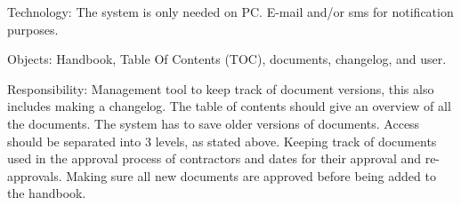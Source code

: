 Technology: The system is only needed on PC. E-mail and/or sms for notification purposes.

Objects: Handbook, Table Of Contents (TOC), documents, changelog, and user.

Responsibility: Management tool to keep track of document versions, this also includes making a changelog. The table of contents should give an overview of all the documents. The system has to save older versions of documents. Access should be separated into 3 levels, as stated above. Keeping track of documents used in the approval process of contractors and dates for their approval and re-approvals. Making sure all new documents are approved before being added to the handbook.
